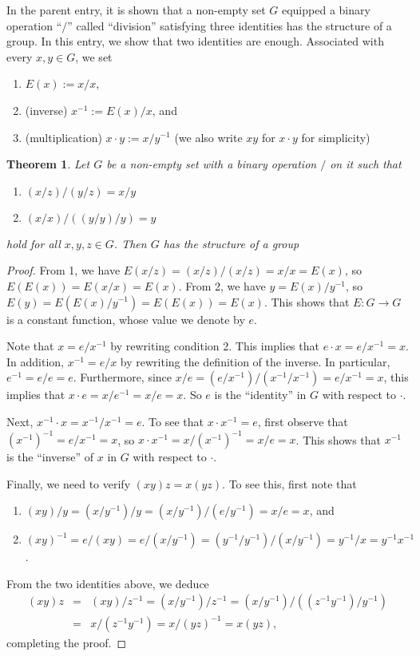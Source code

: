 \documentclass[12pt]{article}
\newtheorem{thm}{Theorem}
\begin{document}
In the parent entry, it is shown that a non-empty set $G$ equipped a binary operation ``$/$'' called ``division'' satisfying three identities has the structure of a group.  In this entry, we show that two identities are enough.  Associated with every $x,y\in G$, we set 
\begin{enumerate}
\item $E(x):=x/x$,
\item (inverse) $x^{-1}:=E(x)/x$, and 
\item (multiplication) $x\cdot y:=x/y^{-1}$ (we also write $xy$ for $x\cdot y$ for simplicity)
\end{enumerate}

\begin{thm}  Let $G$ be a non-empty set with a binary operation $/$ on it such that
\begin{enumerate}
\item $(x/z)/(y/z)=x/y$
\item $(x/x)/((y/y)/y)=y$
\end{enumerate}
hold for all $x,y,z\in G$.  Then $G$ has the structure of a group
\end{thm}
\begin{proof}  From 1, we have $E(x/z)=(x/z)/(x/z)=x/x=E(x)$, so $E(E(x))=E(x/x)=E(x)$.  From 2, we have $y=E(x)/y^{-1}$, so $E(y)=E(E(x)/y^{-1})=E(E(x))=E(x)$.  This shows that $E:G\to G$ is a constant function, whose value we denote by $e$.

Note that $x=e/x^{-1}$ by rewriting condition 2.  This implies that $e\cdot x=e/x^{-1}=x$.  In addition, $x^{-1}=e/x$ by rewriting the definition of the inverse.  In particular, $e^{-1}=e/e=e$.  Furthermore, since $x/e= (e/x^{-1})/(x^{-1}/x^{-1})= e/x^{-1}=x$, this implies that $x\cdot e=x/e^{-1}=x/e=x$.  So $e$ is the ``identity'' in $G$ with respect to $\cdot$.

Next, $x^{-1}\cdot x= x^{-1}/x^{-1}=e$.  To see that $x\cdot x^{-1}=e$, first observe that $(x^{-1})^{-1}=e/x^{-1} =x$, so $x\cdot x^{-1}=x/(x^{-1})^{-1}=x/e=x$.  This shows that $x^{-1}$ is the ``inverse'' of $x$ in $G$ with respect to $\cdot$.

Finally, we need to verify $(xy)z=x(yz)$.  To see this, first note that 
\begin{enumerate}
\item $(xy)/y=(x/y^{-1})/y=(x/y^{-1})/(e/y^{-1}) =x/e=x$, and 
\item $(xy)^{-1}=e/(xy)=e/(x/y^{-1})=(y^{-1}/y^{-1})/(x/y^{-1})=y^{-1}/x=y^{-1}x^{-1}$.
\end{enumerate}
From the two identities above, we deduce 
\begin{eqnarray*}
(xy)z &=& (xy)/z^{-1}=(x/y^{-1})/z^{-1}=(x/y^{-1})/((z^{-1}y^{-1})/y^{-1}) \\ &=& x/(z^{-1}y^{-1})=x/(yz)^{-1}=x(yz),
\end{eqnarray*}
completing the proof.
\end{proof}
\end{document}
